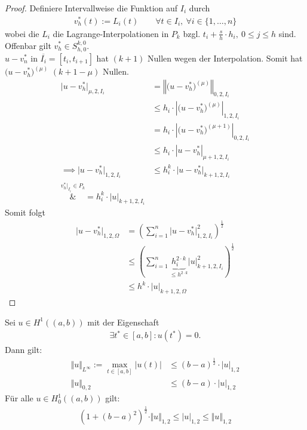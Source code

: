 \begin{proof}
	Definiere Intervallweise die Funktion auf $I_i$ durch
	\begin{align*}
		v_h^\ast(t):=L_i(t)\qquad\forall t\in I_i,~\forall i\in\lbrace1,\ldots,n\rbrace
	\end{align*}
	wobei die $L_i$ die Lagrange-Interpolationen in $P_k$ bzgl. $t_i+\frac{s}{h}\cdot h_i,~0\leq j\leq h$ sind.\\
	Offenbar gilt $v_h^\ast\in S^{k,0}_{h,0}$. \\
	$u-v_n^\ast$ in $\overline{I_i}=[t_i,t_{i+1}]$ hat $(k+1)$ Nullen wegen der Interpolation. Somit hat $\big(u-v_h^\ast)^{(\mu)}$ $(k+1-\mu)$ Nullen.
	\begin{align*}
		\big|u-v_h^\ast\big|_{\mu,2,I_i}
		&=\left\Vert \big(u-v_h^\ast\big)^{(\mu)}\right\Vert_{0,2,I_i}\\
		&\stackrel{}{\leq}
		h_i\cdot\left|\big(u-v_h^\ast\big)^{(\mu)}\right|_{1,2,I_i}\\
		&=h_i\cdot\left|\big(u-v_h^\ast\big)^{(\mu+1)}\right|_{0,2,I_i}\\
		&\leq h_i\cdot\left|u-v_h^\ast\right|_{\mu+1,2,I_i}\\
		\implies
		\big|u-v_h^\ast\big|_{1,2,I_i}
		&\leq h_i^k\cdot\big|u-v_h^\ast\big|_{k+1,2,I_i} \\
		\overset{v_h^\ast|_{I_i}\in P_k}&=
		h_i^k\cdot |u|_{k+1,2,I_i}
	\end{align*}
	Somit folgt
	\begin{align*}
		\big| u-v_h^\ast\big|_{1,2,\Omega}
		&=\left(\sum\limits_{i=1}^n\big|u-v_h^\ast\big|^2_{1,2,I_i}\right)^{\frac{1}{2}}\\
		&\leq\left(\sum\limits_{i=1}^n \underbrace{h_i^{2\cdot k}}_{\leq h^{2\cdot k}} \big|u\big|^2_{k+1,2,I_i}\right)^{\frac{1}{2}}\\
		&\leq h^k\cdot |u|_{k+1,2,\Omega}
	\end{align*}
\end{proof}

\begin{lemma}\label{lemma4.3}
	Sei $u\in H^1((a,b))$ mit der Eigenschaft
	\begin{align*}
		\exists t^\ast\in[a,b]:u(t^\ast)=0.
	\end{align*}
	Dann gilt:
	\begin{align*}
		\Vert  u\Vert_{L^\infty}:=\max\limits_{t\in [a,b]}\big|u(t)\big|&\leq(b-a)^{\frac{1}{2}}\cdot |u|_{1,2}\\
		\Vert u\Vert_{0,2}&\leq(b-a)\cdot|u|_{1,2}
	\end{align*}
	Für alle $u\in H^1_0((a,b))$ gilt:
	\begin{align*}
		\left(1+(b-a)^2\right)^{\frac{1}{2}}\cdot\Vert u\Vert_{1,2}\leq|u|_{1,2}\leq\Vert u\Vert_{1,2}
	\end{align*}
\end{lemma}


